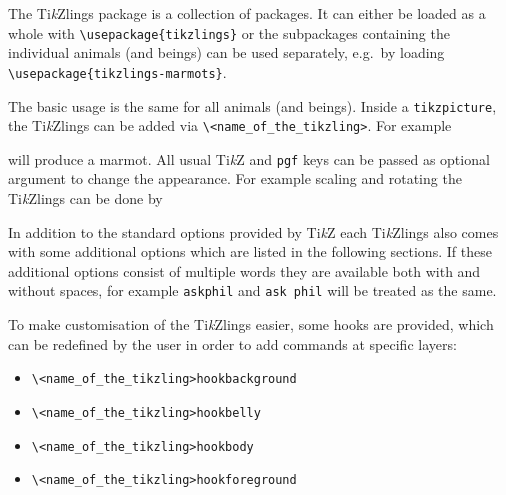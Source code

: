\documentclass[parskip=half]{scrartcl}
\newcommand{\TikZ}{Ti\emph{k}Z\xspace}
\newcommand{\tikzlings}{Ti\emph{k}Zlings\xspace}
\begin{document}
The \tikzlings package is a collection of packages. It can either be loaded as a whole with \lstinline|\usepackage{tikzlings}| or the subpackages containing the individual animals (and beings) can be used separately, e.g.\ by loading \lstinline|\usepackage{tikzlings-marmots}|.

The basic usage is the same for all animals (and beings). Inside a \lstinline|tikzpicture|, the \tikzlings can be added via \color{SteelBlue!50!black}\lstinline|\<name_of_the_tikzling>|\color{black}. For example

\begin{tcblisting}{}
\marmot
\end{tcblisting}

will produce a marmot. All usual \TikZ and \lstinline|pgf| keys can be passed as optional argument to change the appearance. For example scaling and rotating the \tikzlings can be done by

\begin{tcblisting}{}
\penguin[rotate=30,scale=0.5]
\end{tcblisting}

In addition to the standard options provided by \TikZ each \tikzlings also comes with some additional options which are listed in the following sections. If these additional options consist of multiple words they are available both with and without spaces, for example \lstinline|askphil| and \lstinline|ask phil| will be treated as the same.

To make customisation  of the \tikzlings easier, some hooks are provided, which can be redefined by the user in order to add commands at specific layers:
\begin{itemize}
  \color{SteelBlue!50!black}
  \item \lstinline|\<name_of_the_tikzling>hookbackground|
  \item \lstinline|\<name_of_the_tikzling>hookbelly|
  \item \lstinline|\<name_of_the_tikzling>hookbody| 
  \item \lstinline|\<name_of_the_tikzling>hookforeground|
\end{itemize}
\end{document}

